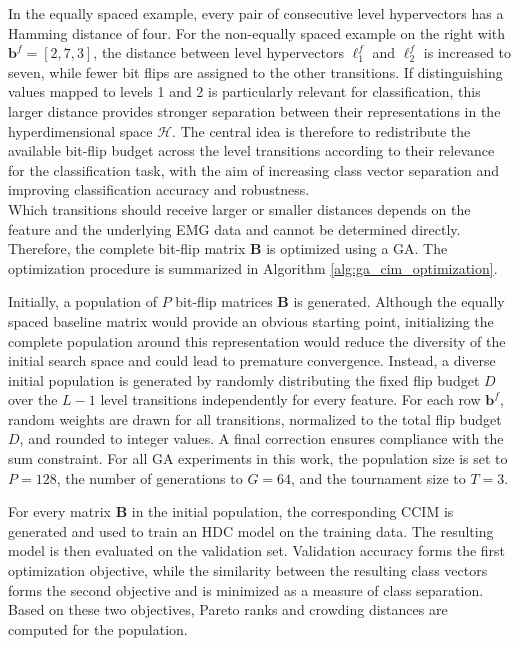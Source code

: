 In the equally spaced example, every pair of consecutive level hypervectors has a Hamming distance of four. For the non-equally spaced example on the right with $\mathbf{b}^f=[2,7,3]$, the distance between level hypervectors $\boldsymbol{\ell}^f_{1}$ and $\boldsymbol{\ell}^f_{2}$ is increased to seven, while fewer bit flips are assigned to the other transitions. If distinguishing values mapped to levels 1 and 2 is particularly relevant for classification, this larger distance provides stronger separation between their representations in the hyperdimensional space $\mathcal{H}$. The central idea is therefore to redistribute the available bit-flip budget across the level transitions according to their relevance for the classification task, with the aim of increasing class vector separation and improving classification accuracy and robustness.\\

Which transitions should receive larger or smaller distances depends on the feature and the underlying EMG data and cannot be determined directly. Therefore, the complete bit-flip matrix $\mathbf{B}$ is optimized using a \ac{GA}. The optimization procedure is summarized in Algorithm \ref{alg:ga_cim_optimization}.

Initially, a population of $P$ bit-flip matrices $\mathbf{B}$ is generated. Although the equally spaced baseline matrix would provide an obvious starting point, initializing the complete population around this representation would reduce the diversity of the initial search space and could lead to premature convergence. Instead, a diverse initial population is generated by randomly distributing the fixed flip budget $D$ over the $L-1$ level transitions independently for every feature. For each row $\mathbf{b}^f$, random weights are drawn for all transitions, normalized to the total flip budget $D$, and rounded to integer values. A final correction ensures compliance with the sum constraint. For all GA experiments in this work, the population size is set to $P=128$, the number of generations to $G=64$, and the tournament size to $T=3$.

For every matrix $\mathbf{B}$ in the initial population, the corresponding \ac{CCIM} is generated and used to train an HDC model on the training data. The resulting model is then evaluated on the validation set. Validation accuracy forms the first optimization objective, while the similarity between the resulting class vectors forms the second objective and is minimized as a measure of class separation. Based on these two objectives, Pareto ranks and crowding distances are computed for the population.

